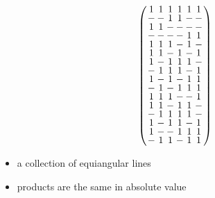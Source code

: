 \documentclass{beamer}
\begin{document}
\begin{frame}

  \[
    \arraycolsep=1.0pt\def\arraystretch{0.75}
    \left(
    \begin{array}{cccccc}
      1&1&1&1&1&1\\
      -&-&1&1&-&-\\
      1&1&-&-&-&-\\
      -&-&-&-&1&1\\
      1&1&1&-&1&-\\
      1&1&-&1&-&1\\
      1&-&1&1&1&-\\
      -&1&1&1&-&1\\
      1&-&1&-&1&1\\
      -&1&-&1&1&1\\
      1&1&1&-&-&1\\
      1&1&-&1&1&-\\
      -&1&1&1&1&-\\
      1&-&1&1&-&1\\
      1&-&-&1&1&1\\
      -&1&1&-&1&1\\
    \end{array}
    \right)
  \]

  \begin{itemize}
    \item a collection of equiangular lines
    \item products are the same in absolute value
  \end{itemize}
  
\end{frame}
\end{document}
